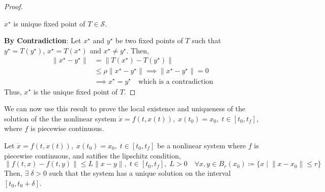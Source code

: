 \begin{proof}
    \begin{claims}
        \(x^{\star} \) is unique fixed point of \(T \in \mathcal{S}\).
    \end{claims}
    \textbf{By Contradiction}: Let \(x^{\star}\) and \(y^{\star}\) be two fixed points of \(T\) such that 
    \(y^{\star} = T(y^{\star})\), \(x^{\star} = T(x^{\star})\) and \(x^{\star} \neq y^{\star}\). Then,
    \[
        \begin{aligned}
            \lVert x^{\star} - y^{\star} \rVert &= \lVert T(x^{\star}) - T(y^{\star}) \rVert \\
            &\leq \rho \lVert x^{\star} - y^{\star} \rVert \implies \lVert x^{\star} - y^{\star} \rVert = 0 \\
            &\implies x^{\star} = y^{\star} \quad \text{which is a contradiction}
        \end{aligned}
    \]  
    Thus, \(x^{\star}\) is the unique fixed point of \(T\).
\end{proof}\vspace{1em}
We can now use this result to prove the local existence and uniqueness of the solution of the the 
nonlinear system \(\dot{x} = f(t,x(t)), \; x(t_0) = x_0, \; t \in [t_0, t_f]\), where \(f\) is piecewise
continuous.
\begin{theorem}
    Let \(\dot{x} = f(t,x(t)), \; x(t_0) = x_0, \; t \in [t_0, t_f]\) be a nonlinear system where \(f\) is
    piecewise continuous, and satifies the lipschitz condition,
    \[
        \lVert f(t,x) - f(t,y) \rVert \leq L \lVert x - y \rVert, \;
        t \in [t_0, t_f], \; L > 0  \quad \forall x, y \in B_r(x_0) \coloneqq \{x \mid \lVert x - x_0 \rVert \leq r\}
    \]
    Then, \( \exists \; \delta > 0\) such that the system has a unique solution on the interval
    \([t_0, t_0 + \delta]\).
\end{theorem}
